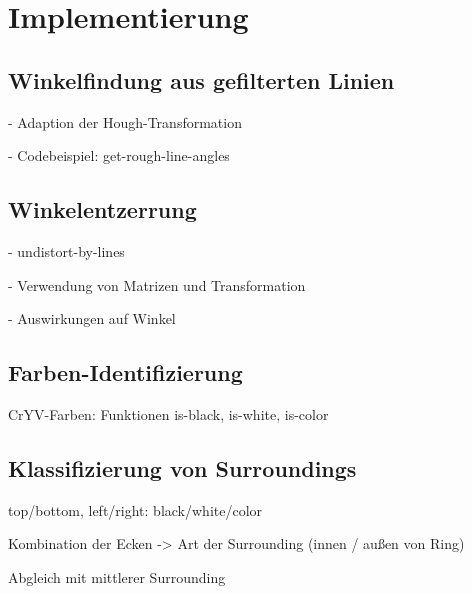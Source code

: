 
\section{Implementierung}
\label{sec:cv:implementierung}



\subsection{Winkelfindung aus gefilterten Linien}
\label{sec:winkelfindung_impl}

- Adaption der Hough-Transformation

- Codebeispiel: get-rough-line-angles



\subsection{Winkelentzerrung}
\label{sec:winkelentzerrung_impl}

- undistort-by-lines

- Verwendung von Matrizen und Transformation

- Auswirkungen auf Winkel



\subsection{Farben-Identifizierung}
\label{sec:farbidentifizierung_impl}

CrYV-Farben: Funktionen is-black, is-white, is-color



\subsection{Klassifizierung von Surroundings}
\label{sec:surroundings_impl}

top/bottom, left/right: black/white/color

Kombination der Ecken -> Art der Surrounding (innen / außen von Ring)

Abgleich mit mittlerer Surrounding


